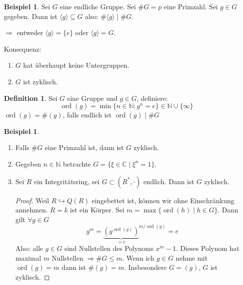 \documentclass[12pt,parskip=full]{scrartcl}
\newcommand{\setN}{\mathbb{N}}
\newcommand{\setC}{\mathbb{C}}
\theoremstyle{definition}
\newtheorem{definition}[theorem]{Definition}
\newtheorem{example}[theorem]{Beispiel}
\theoremstyle{remark}
\begin{document}
	\begin{example}
		Sei $G$ eine endliche Gruppe. Sei $\#G = p$ eine Primzahl. Sei $g \in G$ gegeben. Dann ist $\langle g \rangle \subseteq G$ also: $\#\langle g \rangle \mid \#G$.
		
		$\Rightarrow$ entweder $\langle g \rangle = \{ e \}$ oder $\langle g \rangle = G$.
		
		Konsequenz:
		\begin{enumerate}
			\item $G$ hat überhaupt keine Untergruppen.
			\item $G$ ist zyklisch.
		\end{enumerate}
	\end{example}

	\begin{definition}
		Sei $G$ eine Gruppe und $g \in G$, definiere:
		\begin{equation*}
			\operatorname{ord}(g) = \min \{ n \in \setN : g^n = e \} \in \setN \cup \{ \infty \}
		\end{equation*}
		$\operatorname{ord}(g) = \#(g)$, falls endlich ist $\operatorname{ord}(g) \mid \#G$
	\end{definition}

	\begin{example}
		\begin{enumerate}
			\item Falls $\#G$ eine Primzahl ist, dann ist $G$ zyklisch.
			\item Gegeben $n \in \setN$ betrachte $G = \{ \xi \in \setC \mid \xi^n = 1 \}$.
			\item Sei $R$ ein Integritätsring, sei $G \subset (R^*, \cdot)$ endlich. Dann ist $G$ zyklisch.
			\begin{proof}
				Weil $R \hookrightarrow Q(R)$ eingebettet ist, können wir ohne Einschränkung annehmen. $R = k$ ist ein Körper. Sei $m = \max \{ \operatorname{ord}(h) \mid h \in G \}$. Dann gilt $\forall g \in G$
				\begin{equation*}
					g^m = {\underbrace{\left( g^{\operatorname{ord}(g)} \right)}_{=e}}^{m/\operatorname{ord}(g)} = e
				\end{equation*}
				Also: alle $g \in G$ sind Nullstellen des Polynoms $x^m - 1$. Dieses Polynom hat maximal $m$ Nullstellen $\Rightarrow \#G \leq m$. Wenn ich $g \in G$ nehme mit $\operatorname{ord}(g) = m$ dann ist $\#(g) = m$. Insbesondere $G = (g)$, $G$ ist zyklisch.
			\end{proof}
		\end{enumerate}
	\end{example}
\end{document}
